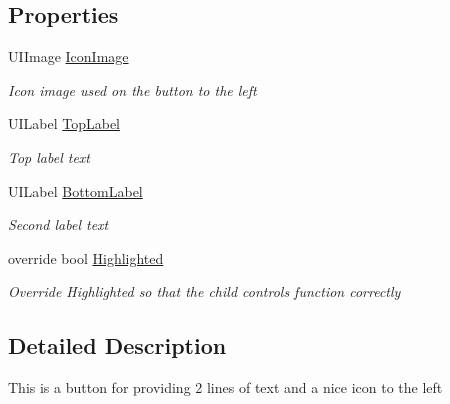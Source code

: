 \subsection*{Properties}
\begin{DoxyCompactItemize}
\item 
U\+I\+Image \hyperlink{class_field_service_1_1i_o_s_1_1_text_button_a7647daf80507478a6a0d7b07c3d0bde4}{Icon\+Image}
\begin{DoxyCompactList}\small\item\em Icon image used on the button to the left \end{DoxyCompactList}\item 
U\+I\+Label \hyperlink{class_field_service_1_1i_o_s_1_1_text_button_a7f7b25febb01096323e84c69a765bac1}{Top\+Label}
\begin{DoxyCompactList}\small\item\em Top label text \end{DoxyCompactList}\item 
U\+I\+Label \hyperlink{class_field_service_1_1i_o_s_1_1_text_button_afc8f9bf0a4b798c479a3d2c04eb1e318}{Bottom\+Label}
\begin{DoxyCompactList}\small\item\em Second label text \end{DoxyCompactList}\item 
override bool \hyperlink{class_field_service_1_1i_o_s_1_1_text_button_af2894452cd8de117f53b7a155de9f731}{Highlighted}
\begin{DoxyCompactList}\small\item\em Override Highlighted so that the child controls function correctly \end{DoxyCompactList}\end{DoxyCompactItemize}


\subsection{Detailed Description}
This is a button for providing 2 lines of text and a nice icon to the left 




